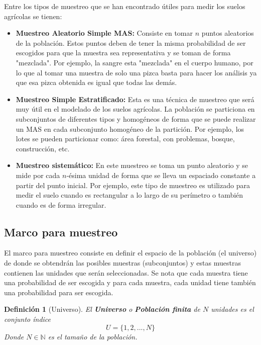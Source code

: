 \documentclass{report}
\newtheorem{definition}{Definición}
\begin{document}
Entre los tipos de muestreo que se han encontrado útiles para medir los suelos agrícolas se tienen:

\begin{itemize}
    \item \textbf{Muestreo Aleatorio Simple MAS:} Consiste en tomar $n$ puntos aleatorios de la población. Estos puntos deben de tener la misma probabilidad de ser escogidos para que la muestra sea representativa y se toman de forma "mezclada". Por ejemplo, la sangre esta "mezclada" en el cuerpo humano, por lo que al tomar una muestra de solo una pizca basta para hacer los análisis ya que esa pizca obtenida es igual que todas las demás.
    
    \item \textbf{Muestreo Simple Estratificado:} Esta es una técnica de muestreo que será muy útil en el modelado de los suelos agrícolas. La población se particiona en subconjuntos de diferentes tipos y homogéneos de forma que se puede realizar un MAS en cada subconjunto homogéneo de la partición. Por ejemplo, los lotes se pueden particionar como: área forestal, con problemas, bosque, construcción, etc.
    
    \item \textbf{Muestreo sistemático:} En este muestreo se toma un punto aleatorio y se mide por cada $n$-ésima unidad de forma que se lleva un espaciado constante a partir del punto inicial. Por ejemplo, este tipo de muestreo es utilizado para medir el suelo cuando es rectangular a lo largo de su perímetro o también cuando es de forma irregular.
\end{itemize}

\subsection{Marco para muestreo}

El marco para muestreo \cite{lohr-2009} consiste en definir el espacio de la población (el universo) de donde se obtendrán las posibles muestras (subconjuntos) y estas muestras contienen las unidades que serán seleccionadas. Se nota que cada muestra tiene una probabilidad de ser escogida y para cada muestra, cada unidad tiene también una probabilidad para ser escogida.

\begin{definition}[Universo]
    El \textbf{Universo} o \textbf{Población finita} de $N$ unidades es el conjunto índice
    $$
    U = \{ 1, 2, ..., N \}
    $$
    Donde $N \in \mathbb{N}$ es el tamaño de la población.
\end{definition}
\end{document}
